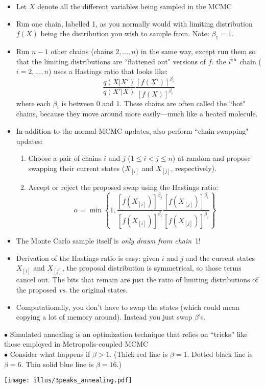 \begin{itemize}
\item Let $X$ denote all the different variables being sampled in the MCMC
\item Run one chain, labelled 1, as you normally would with limiting distribution $f(X)$ being the distribution you wish to sample from.  Note: $\beta_1 = 1$.
\item Run $n-1$ other chains (chains $2,\ldots,n$) in the same way, except run them so that the limiting distributions  are ``flattened out" versions of $f$. \ie{} the $i^\mathrm{th}$ chain ($i=2,\ldots,n$) uses a Hastings ratio that looks like:
\[
	\frac{q(X|X')}{q(X'|X)} \frac{[f(X')]^{\beta_i}}{[f(X)]^{\beta_i}}
\] 
where each $\beta_i$ is between 0 and 1.  These chains are often called the ``hot" chains, because they move around more easily---much like a heated molecule.
\item In addition to the normal MCMC updates, also perform ``chain-swapping" updates:
\begin{enumerate}
\item Choose a pair of chains $i$ and $j$ ($1\leq i < j \leq n$) at random and propose swapping their current states ($X_{[i]}$ and $X_{[j]}$, respectively).
\item Accept or reject the proposed swap using the Hastings ratio:
\[
	\alpha = \min\left\{
		1, \frac{[f(X_{[i]})]^{\beta_j}}{[f(X_{[i]})]^{\beta_i}}
		\frac{[f(X_{[j]})]^{\beta_i}}{[f(X_{[j]})]^{\beta_j}}
	\right\}
\]
\end{enumerate}
\item The Monte Carlo sample itself is {\em only drawn from chain}~1!
\item Derivation of the Hastings ratio is easy: given $i$ and $j$ and the current states $X_{[i]}$ and $X_{[j]}$, the proposal distribution is symmetrical, so those terms cancel out.  The bits that remain are just the ratio of limiting distributions of the proposed {\em vs}. the original states.
\item Computationally, you don't have to swap the states (which could mean copying a lot of memory around).  Instead you just swap $\beta$'s.
\end{itemize}








\vspace*{-1.4em}
\enlargethispage*{100pt}
$\bullet$ Simulated annealing is an optimization technique that relies on ``tricks'' like those employed in Metropolis-coupled MCMC   \\
$\bullet$ Consider what happens if $\beta>1$. {\small (Thick red line is $\beta=1$.  Dotted black line is $\beta=6$. Thin solid blue line is
$\beta=16$.)}
\vspace*{-.19in}
\begin{center}
\texttt{[image: illus/3peaks\_annealing.pdf]}
\end{center}




